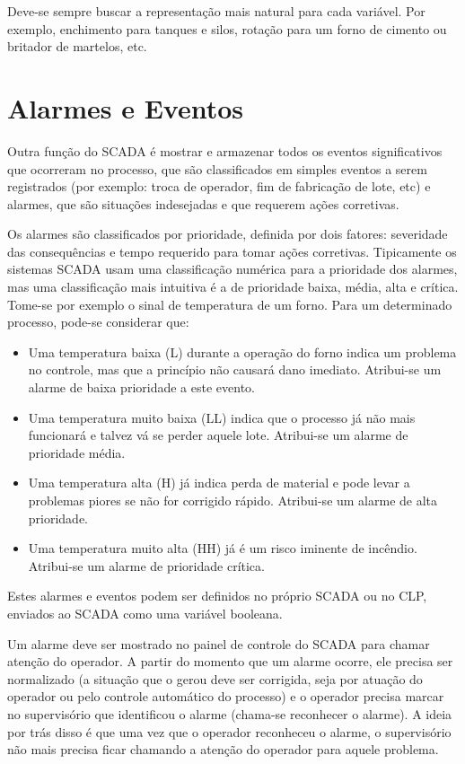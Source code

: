 Deve-se sempre buscar a representação mais natural para cada variável. Por exemplo, enchimento para tanques e silos, rotação para um
forno de cimento ou britador de martelos, etc.


\section{Alarmes e Eventos}
\label{sec:Alarmes e Eventos}
Outra função do SCADA é mostrar e armazenar todos os eventos significativos que ocorreram no processo, que são classificados em simples eventos a serem registrados (por exemplo: troca de operador, fim de fabricação de lote, etc) e alarmes, que são situações indesejadas e que requerem ações corretivas.

Os alarmes são classificados por prioridade, definida por dois fatores: severidade das consequências e tempo requerido para tomar ações corretivas. Tipicamente os sistemas SCADA usam uma classificação numérica para a prioridade dos alarmes, mas uma classificação mais intuitiva é a de prioridade baixa, média, alta e crítica. Tome-se por exemplo o sinal de temperatura de um forno. Para um determinado processo, pode-se considerar que:
\begin{itemize}
	\item Uma temperatura baixa (L) durante a operação do forno indica um problema no controle, mas que a princípio não causará dano imediato. Atribui-se um alarme de baixa prioridade a este evento.
	\item Uma temperatura muito baixa (LL) indica que o processo já não mais funcionará e talvez vá se perder aquele lote. Atribui-se um alarme de prioridade média.
	\item Uma temperatura alta (H) já indica perda de material e pode levar a problemas piores se não for corrigido rápido. Atribui-se um alarme de alta prioridade.
	\item Uma temperatura muito alta (HH) já é um risco iminente de incêndio. Atribui-se um alarme de prioridade crítica.
\end{itemize}

Estes alarmes e eventos podem ser definidos no próprio SCADA ou no CLP, enviados ao SCADA como uma variável booleana.

Um alarme deve ser mostrado no painel de controle do SCADA para chamar atenção do operador. A partir do momento que um alarme ocorre, ele precisa ser normalizado (a situação que o gerou deve ser corrigida, seja por atuação do operador ou pelo controle automático do processo) e o operador precisa marcar no supervisório que identificou o alarme (chama-se reconhecer o alarme). A ideia por trás disso é que uma vez que o operador reconheceu o alarme, o supervisório não mais precisa ficar chamando a atenção do operador para aquele problema.

